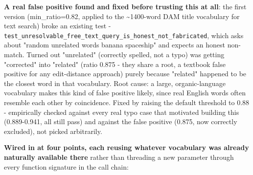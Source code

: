 \textbf{A real false positive found and fixed before trusting this at all}: the first version (min\_ratio=0.82, applied to the \textasciitilde{}1400-word DAM title vocabulary for text search) broke an existing test -\texttt{test\_\allowbreak{}unresolvable\_\allowbreak{}free\_\allowbreak{}text\_\allowbreak{}query\_\allowbreak{}is\_\allowbreak{}honest\_\allowbreak{}not\_\allowbreak{}fabricated}, which asks about "random unrelated words banana spaceship" and expects an honest non-match. Turned out "unrelated" (correctly spelled, not a typo) was getting "corrected" into "related" (ratio 0.875 - they share a root, a textbook false positive for any edit-distance approach) purely because "related" happened to be the closest word in that vocabulary. Root cause: a large, organic-language vocabulary makes this kind of false positive likely, since real English words often resemble each other by coincidence. Fixed by raising the default threshold to 0.88 - empirically checked against every real typo case that motivated building this (0.889-0.941, all still pass) and against the false positive (0.875, now correctly excluded), not picked arbitrarily.

\textbf{Wired in at four points, each reusing whatever vocabulary was already naturally available there} rather than threading a new parameter through every function signature in the call chain:

